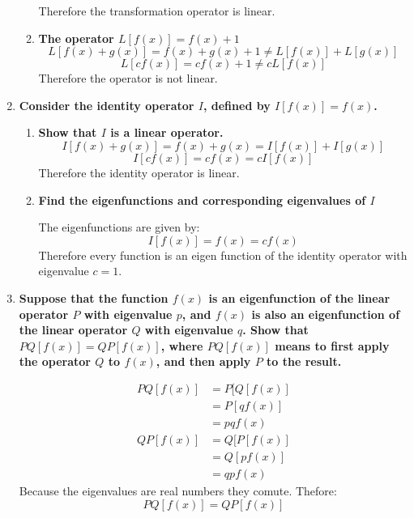 \documentclass[9pt]{report}
\begin{document}
\begin{enumerate}
\begin{enumerate}
\[            \]
            Therefore the transformation operator is linear.
          \item \textbf{The operator $L[f(x)] = f(x) + 1$}
            \[
              L[f(x) + g(x)] = f(x) + g(x) + 1 \neq L[f(x)] + L[g(x)]
            \]
            \[
              L[cf(x)] = cf(x) + 1 \neq cL[f(x)]
            \]
            Therefore the operator is not linear.
        \end{enumerate}
      \item \textbf{Consider the identity operator $I$, defined by $I[f(x)] = f(x)$.}
        \begin{enumerate}
          \item \textbf{Show that $I$ is a linear operator.}
            \[
              I[f(x) + g(x)] = f(x) + g(x) = I[f(x)] + I[g(x)]
            \]
            \[
              I[cf(x)] = cf(x) = cI[f(x)]
            \]
            Therefore the identity operator is linear.
          \item \textbf{Find the eigenfunctions and corresponding eigenvalues of $I$}

            The eigenfunctions are given by:
            \[
              I[f(x)] = f(x) = cf(x)
            \]
            Therefore every function is an eigen function of the identity operator
            with eigenvalue $c=1$.
        \end{enumerate}
      \item \textbf{Suppose that the function $f(x)$ is an eigenfunction of the linear
          operator $P$ with eigenvalue $p$, and $f(x)$ is also an eigenfunction of the
          linear operator $Q$ with eigenvalue $q$. Show that $PQ[f(x)] = QP[f(x)]$, where
          $PQ[f(x)]$ means to first apply the operator $Q$ to $f(x)$, and then apply
        $P$ to the result.}

        \[
          \begin{align}
            PQ[f(x)] &= P[Q[f(x)] \\
                     &= P[q f(x) ] \\
                     &= pqf(x)
          \end{align}
        \]
        \[
          \begin{align}
            QP[f(x)] &= Q[P[f(x)] \\
                     &= Q[p f(x) ] \\
                     &= qpf(x)
          \end{align}
        \]
        Because the eigenvalues are real numbers they comute. Thefore:
        \[
          PQ[f(x)] = QP[f(x)]
        \]


\end{enumerate}
\end{document}
